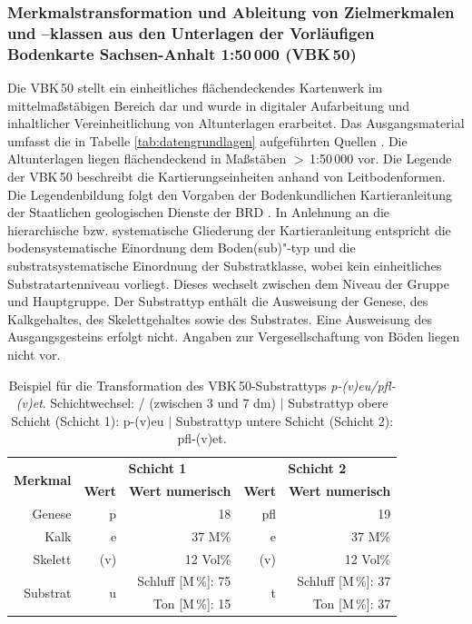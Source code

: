 \subsubsection{Merkmalstransformation und Ableitung von Zielmerkmalen und –klassen aus den Unterlagen der Vorläufigen Bodenkarte Sachsen-Anhalt 1:50\,000 (VBK\,50)}\label{sec:trans-vbk}
Die VBK\,50 stellt ein einheitliches flächendeckendes Kartenwerk im mittelmaßstäbigen Bereich dar und wurde in digitaler Aufarbeitung und inhaltlicher Vereinheitlichung von Altunterlagen erarbeitet. Das Ausgangsmaterial umfasst die in Tabelle \ref{tab:datengrundlagen} aufgeführten Quellen \citep{Hartmann2014}. Die Altunterlagen liegen flächendeckend in Maßstäben  $>$\,1:50\,000 vor. Die Legende der VBK\,50 beschreibt die Kartierungseinheiten anhand von Leitbodenformen. Die Legendenbildung folgt den Vorgaben der Bodenkundlichen Kartieranleitung der Staatlichen geologischen Dienste der BRD \citep{KA5}. In Anlehnung an die hierarchische bzw. systematische Gliederung der Kartieranleitung entspricht die bodensystematische Einordnung dem Boden(sub)"-typ und die substratsystematische Einordnung der Substratklasse, wobei kein einheitliches Substratartenniveau vorliegt. Dieses wechselt zwischen dem Niveau der Gruppe und Hauptgruppe. Der Substrattyp enthält die Ausweisung der Genese, des Kalkgehaltes, des Skelettgehaltes sowie des Substrates. Eine Ausweisung des Ausgangsgesteins erfolgt nicht. Angaben zur Vergesellschaftung von Böden liegen nicht vor.


\begin{table}[t]
  \centering
  \caption[Beispiel für die Transformation des VBK\,50-Substrattyps\textit{ p-(v)eu/pfl-(v)et}.]{Beispiel für die Transformation des VBK\,50-Substrattyps\textit{ p-(v)eu/pfl-(v)et}. Schichtwechsel: / (zwischen 3 und 7 dm) $|$ Substrattyp obere Schicht (Schicht 1): p-(v)eu $|$ Substrattyp untere Schicht (Schicht 2): pfl-(v)et.}\label{tab:trans-vbk}
	\vspace*{6pt}
    \begin{tabular}{r|r|r|r|r}
    \toprule
    \multirow{2}[4]{*}{\textbf{Merkmal}} & \multicolumn{2}{c|}{\textbf{Schicht 1}} & \multicolumn{2}{c}{\textbf{Schicht 2}} \\
 & \textbf{Wert} & \textbf{Wert numerisch} & \textbf{Wert} & \textbf{Wert numerisch} \\\midrule
    Genese & p     & 18    & pfl   & 19 \\\midrule
    Kalk  & e     & 37 M\% & e     & 37 M\% \\\midrule
    Skelett & (v)   & 12 Vol\% & (v)   & 12 Vol\% \\\midrule
    \multirow{2}[2]{*}{Substrat} & \multirow{2}[2]{*}{u} & Schluff [M\,\%]: 75 & \multirow{2}[2]{*}{t} & Schluff [M\,\%]: 37 \\
          &       & Ton [M\,\%]: 15 &       & Ton [M\,\%]: 37 \\
    \bottomrule
    \end{tabular}%
  \label{tab:addlabel}%
\end{table}%

